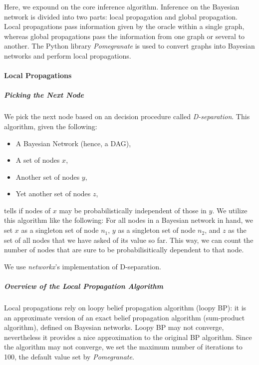 Here, we expound on the core inference algorithm. Inference on the Bayesian
network is divided into two parts: local propagation and global propagation.
Local propagations pass information given by the oracle within a single graph,
whereas global propagations pass the information from one graph or several to
another. The Python library \emph{Pomegranate} is used to convert graphs into
Bayesian networks and perform local propagations.   %

\paragraph{Local Propagations}

\subparagraph{Picking the Next Node}

We pick the next node based on an decision procedure called \emph{D-separation}.
This algorithm, given the following:

\begin{itemize}
\item A Bayesian Network (hence, a DAG),
\item A set of nodes $x$,
\item Another set of nodes $y$,
\item Yet another set of nodes $z$,
\end{itemize}

tells if nodes of $x$ may be probabilistically independent of those in $y$. We
utilize this algorithm like the following: For all nodes in a Bayesian network in
hand, we set $x$ as a singleton set of node $n_1$, $y$ as a singleton set of
node $n_2$, and $z$ as the set of all nodes that we have asked of its value so
far. This way, we can count the number of nodes that are sure to be
probabilisitically dependent to that node.



We use \emph{networkx}'s implementation of D-separation.

\subparagraph{Overview of the Local Propagation Algorithm}

Local propagations rely on loopy belief propagation algorithm (loopy BP): it is an
approximate version of an exact belief propagation algorithm (sum-product
algorithm), defined on Bayesian networks. Loopy BP may not converge,
nevertheless it provides a nice approximation to the original BP algorithm.
Since the algorithm may not converge, we set the maximum number of iterations to
100, the default value set by \emph{Pomegranate}.

